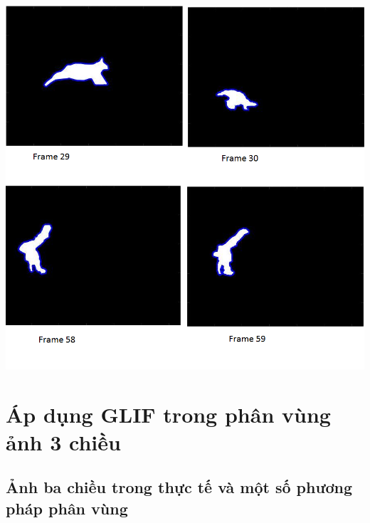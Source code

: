 \documentclass[12pt, oneside, a4paper]{book}
\begin{document}
\begin{center}
\includegraphics[scale=0.5]{figure/animals.png}
\end{center}
\chapter{Áp dụng GLIF trong phân vùng ảnh 3 chiều}
\section{Ảnh ba chiều trong thực tế và một số phương pháp phân vùng}
\end{document}
